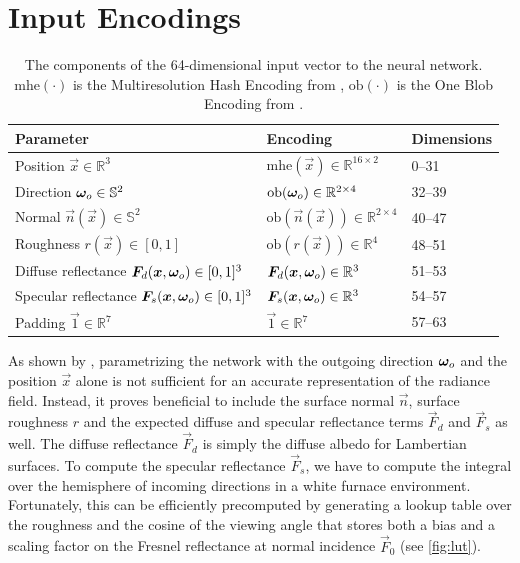 \section{Input Encodings}
\begin{table}[htb!]
    \centering
    \begin{tabular}{l l l}
        \textbf{Parameter} & \textbf{Encoding} & \textbf{Dimensions} \\
        \midrule
        Position $\vec{x} \in \mathbb{R}^3$ & $\mathrm{mhe}(\vec{x}) \in \mathbb{R}^{16 \times 2}$ & 0--31 \\
        Direction ${\bm{\omega}_o} \in \mathbb{S}^2$ & $\mathrm{ob}({\bm{\omega}_o}) \in \mathbb{R}^{2 \times 4}$ & 32--39 \\
        Normal $\vec{n}(\vec{x}) \in \mathbb{S}^2$ & $\mathrm{ob}(\vec{n}(\vec{x})) \in \mathbb{R}^{2 \times 4}$ & 40--47 \\
        Roughness $r(\vec{x}) \in [0,1]$ & $\mathrm{ob}(r(\vec{x})) \in \mathbb{R}^{4}$ & 48--51 \\
        Diffuse reflectance $\bm{F}_d(\bm{x}, {\bm{\omega}_o}) \in [0,1]^3$ & $\bm{F}_d(\bm{x}, {\bm{\omega}_o}) \in \mathbb{R}^{3}$ & 51--53 \\
        Specular reflectance $\bm{F}_s(\bm{x}, {\bm{\omega}_o}) \in [0,1]^3$ & $\bm{F}_s(\bm{x}, {\bm{\omega}_o}) \in \mathbb{R}^{3}$ & 54--57 \\
        Padding $\vec{1} \in \mathbb{R}^7$ & $\vec{1} \in \mathbb{R}^7$ & 57--63 \\ %
    \end{tabular}
    \caption{The components of the 64-dimensional input vector to the neural network. $\mathrm{mhe}(\cdot)$ is the Multiresolution Hash Encoding from \textcite{muller2022}, $\mathrm{ob}(\cdot)$ is the One Blob Encoding from \textcite{muller2021}.}
    \label{tab:input-encoding}
\end{table}
As shown by \textcite{ren2013}, parametrizing the network with the outgoing direction ${\bm{\omega}_o}$ and the position $\vec{x}$ alone is not sufficient for an accurate representation of the radiance field.
Instead, it proves beneficial to include the surface normal $\vec{n}$, surface roughness $r$ and the expected diffuse and specular reflectance terms $\vec{F}_d$ and $\vec{F}_s$ as well.
The diffuse reflectance $\vec{F}_d$ is simply the diffuse albedo for Lambertian surfaces.
To compute the specular reflectance $\vec{F}_s$, we have to compute the integral over the hemisphere of incoming directions in a white furnace environment.
Fortunately, this can be efficiently precomputed by generating a lookup table over the roughness and the cosine of the viewing angle that stores both a bias and a scaling factor on the Fresnel reflectance at normal incidence $\vec{F}_0$ (see \cref{fig:lut}).
